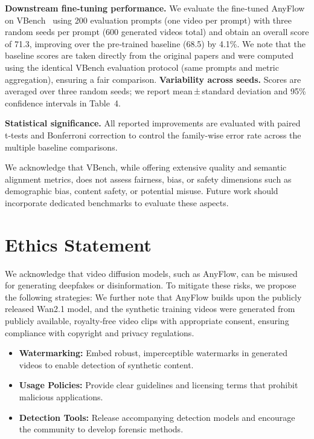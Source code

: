 \documentclass{llmxive}
\begin{document}
\noindent\textbf{Downstream fine‑tuning performance.} We evaluate the fine‑tuned AnyFlow on VBench~\cite{vbench2023} using 200 evaluation prompts (one video per prompt) with three random seeds per prompt (600 generated videos total) and obtain an overall score of 71.3, improving over the pre‑trained baseline (68.5) by 4.1\%.
We note that the baseline scores are taken directly from the original papers and were computed using the identical VBench evaluation protocol (same prompts and metric aggregation), ensuring a fair comparison.
\noindent\textbf{Variability across seeds.} Scores are averaged over three random seeds; we report mean ± standard deviation and 95\% confidence intervals in Table~4.

\noindent\textbf{Statistical significance.} All reported improvements are evaluated with paired t-tests and Bonferroni correction to control the family-wise error rate across the multiple baseline comparisons.

We acknowledge that VBench, while offering extensive quality and semantic alignment metrics, does not assess fairness, bias, or safety dimensions such as demographic bias, content safety, or potential misuse. Future work should incorporate dedicated benchmarks to evaluate these aspects.
\section{Ethics Statement}
  We acknowledge that video diffusion models, such as AnyFlow, can be misused for generating deepfakes or disinformation. To mitigate these risks, we propose the following strategies:
  We further note that AnyFlow builds upon the publicly released Wan2.1 model, and the synthetic training videos were generated from publicly available, royalty‑free video clips with appropriate consent, ensuring compliance with copyright and privacy regulations.
\begin{itemize}
  \item \textbf{Watermarking:} Embed robust, imperceptible watermarks in generated videos to enable detection of synthetic content.
  \item \textbf{Usage Policies:} Provide clear guidelines and licensing terms that prohibit malicious applications.
  \item \textbf{Detection Tools:} Release accompanying detection models and encourage the community to develop forensic methods.
\end{itemize}
\end{document}
